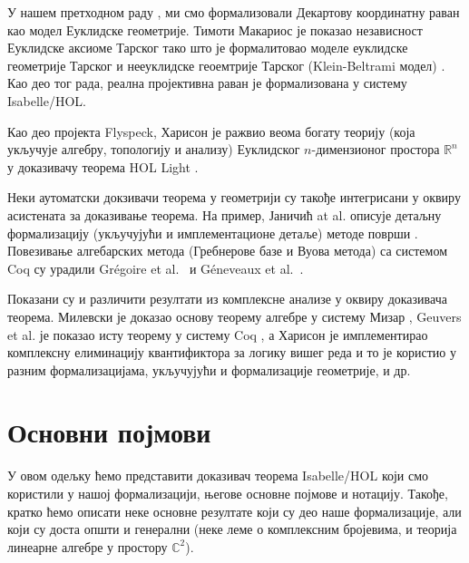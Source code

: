 У нашем претходном раду \cite{algmethods,analytic}, ми смо
формализовали Декартову координатну раван као модел Еуклидске
геометрије. Тимоти Макариос је показао независност Еуклидске аксиоме
Тарског тако што је формалитовао моделе еуклидске геометрије Тарског и
нееуклидске геоемтрије Тарског (Klein-Beltrami модел)
\cite{makarios}. Као део тог рада, реална пројективна раван је
формализована у систему Isabelle/HOL.

Као део пројекта Flyspeck, Харисон је ражвио веома богату теорију
(која укључује алгебру, топологију и анализу) Еуклидског
$n$-димензионог простора $\mathbb{R}^n$ у доказивачу теорема HOL Light
\cite{harrison05,harrison13}.

Неки аутоматски докзивачи теорема у геометрији су такође интегрисани у
оквиру асистената за доказивање теорема. На пример, Јаничић at
al. описује детаљну формализацију (укључујући и имплементационе
детаље) методе површи \cite{areamethod}. Повезивање алгебарских метода
(Гребнерове базе и Вуова метода) са системом Coq су урадили
Gr{\'e}goire et al.~\cite{certificates} и G\'eneveaux et
al.~\cite{wu-certificates}.

Показани су и различити резултати из комплексне анализе у оквиру
доказивача теорема. Милевски је доказао основу теорему алгебре у
систему Мизар \cite{ftamizar}, Geuvers et al. је показао исту теорему
у систему Coq \cite{ftacoq}, а Харисон је имплементирао комплексну
елиминацију квантификтора за логику вишег реда и то је користио у
разним формализацијама, укључујући и формализације геометрије, и др.

\section{Основни појмови}

\label{sec:background}
У овом одељку ћемо представити доказивач теорема Isabelle/HOL који смо
користили у нашој формализацији, његове основне појмове и
нотацију. Такође, кратко ћемо описати неке основне резултате који су
део наше формализације, али који су доста општи и генерални (неке леме
о комплексним бројевима, и теорија линеарне алгебре у простору
$\mathbb{C}^2$).

